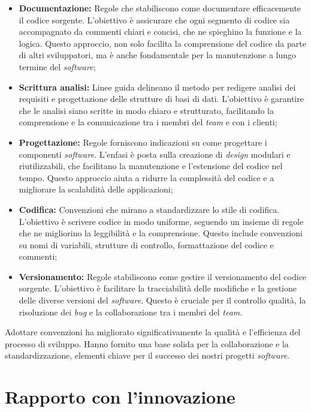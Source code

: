 \begin{itemize}
\item \textbf{Documentazione:} Regole che stabiliscono come documentare efficacemente il codice sorgente. 
L'obiettivo è assicurare che ogni segmento di codice sia accompagnato da commenti chiari e concisi, che ne spieghino la funzione e la logica. 
Questo approccio, non solo facilita la comprensione del codice da parte di altri sviluppatori, ma è anche fondamentale per la manutenzione a lungo termine del \textit{software};

\item \textbf{Scrittura analisi:} Linee guida delineano il metodo per redigere analisi dei requisiti e progettazione delle strutture di basi di dati. 
L'obiettivo è garantire che le analisi siano scritte in modo chiaro e strutturato, facilitando la comprensione e la comunicazione tra i membri del \textit{team} e con i clienti;

\item \textbf{Progettazione:} Regole forniscono indicazioni su come progettare i componenti \textit{software}. 
L'enfasi è posta sulla creazione di \textit{design} modulari e riutilizzabili, che facilitano la manutenzione e l'estensione del codice nel tempo. 
Questo approccio aiuta a ridurre la complessità del codice e a migliorare la scalabilità delle applicazioni;

\item \textbf{Codifica:} Convenzioni che mirano a standardizzare lo stile di codifica. L'obiettivo è scrivere codice in modo uniforme, seguendo un insieme di regole che ne migliorino la leggibilità e la comprensione. Questo include convenzioni su nomi di variabili, strutture di controllo, formattazione del codice e commenti;

\item \textbf{Versionamento:} Regole stabiliscono come gestire il versionamento del codice sorgente. 
L'obiettivo è facilitare la tracciabilità delle modifiche e la gestione delle diverse versioni del \textit{software}. 
Questo è cruciale per il controllo qualità, la risoluzione dei \textit{bug} e la collaborazione tra i membri del \textit{team}.
\end{itemize}

Adottare convenzioni ha migliorato significativamente la qualità e l'efficienza del processo di sviluppo. Hanno fornito una base solida per la collaborazione e la standardizzazione, elementi chiave per il successo dei nostri progetti \textit{software}.
\section{Rapporto con l'innovazione}

